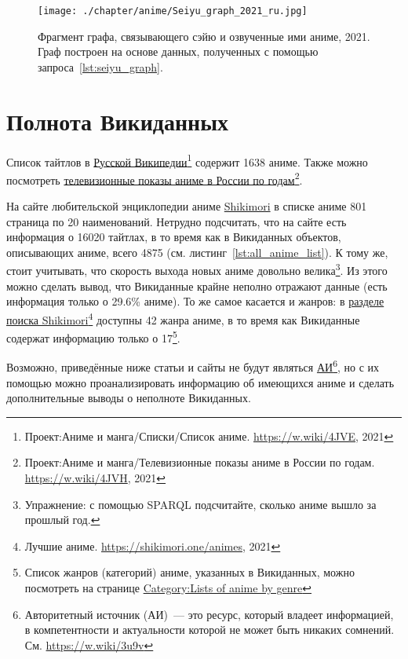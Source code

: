 \newpage
\begin{fullwidth}
\begin{figure*}[h]
	\texttt{[image: ./chapter/anime/Seiyu\_graph\_2021\_ru.jpg]}
	\caption[Граф сэйю и аниме, 2021.]{Фрагмент графа, связывающего сэйю и озвученные ими аниме, 2021. Граф построен на основе данных, полученных с помощью запроса~\protect\ref{lst:seiyu_graph}.}%
      \label{fig:Seiyu_graph_2021_ru}%
\end{figure*} 
\end{fullwidth}

\section{Полнота Викиданных}

Список тайтлов в \href{https://w.wiki/4JVE}{Русской Википедии}\footnote{Проект:Аниме и манга/Списки/Список аниме. \href{https://w.wiki/4JVE}{https://w.wiki/4JVE}, 2021} содержит \num{1638} аниме. Также можно посмотреть \href{https://w.wiki/4JVH}{телевизионные показы аниме в России по годам}\footnote{Проект:Аниме и манга/Телевизионные показы аниме в России по годам. \href{https://w.wiki/4JVH}{https://w.wiki/4JVH}, 2021}.

На сайте любительской энциклопедии аниме \href{https://shikimori.one/}{Shikimori}\autocite{shikimori} в списке аниме \num{801} страница по \num{20} наименований. Нетрудно подсчитать, что на сайте есть информация о \num{16020} тайтлах, в то время как в Викиданных объектов, описывающих аниме, всего \num{4875} (см. листинг~\protect\ref{lst:all_anime_list}). К тому же, стоит учитывать, что скорость выхода новых аниме довольно велика\footnote{Упражнение: с помощью SPARQL подсчитайте, сколько аниме вышло за прошлый год.}. Из этого можно сделать вывод, что Викиданные крайне неполно отражают данные (есть информация только о \num{29.6}\% аниме). То же самое касается и жанров: в \href{https://shikimori.one/animes}{разделе поиска Shikimori}\footnote{Лучшие аниме. \href{https://shikimori.one/animes}{https://shikimori.one/animes}, 2021} доступны \num{42} жанра аниме, в то время как Викиданные содержат информацию только о \num{17}\footnote{Список жанров (категорий) аниме, указанных в Викиданных, можно посмотреть на странице \href{https://en.wikipedia.org/wiki/Category:Lists\_of_anime\_by\_genre}{Category:Lists of anime by genre}}.

Возможно, приведённые ниже статьи и сайты не будут являться \href{https://w.wiki/3u9v}{АИ}\footnote{Авторитетный источник (АИ)~--- это ресурс, который владеет информацией, в компетентности и актуальности которой не может быть никаких сомнений. См. \href{https://w.wiki/3u9v}{https://w.wiki/3u9v}}, но с их помощью можно проанализировать информацию об имеющихся аниме и сделать дополнительные выводы о неполноте Викиданных.

